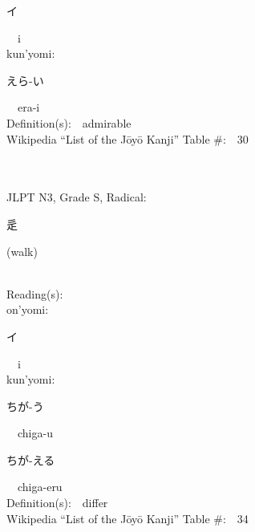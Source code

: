 \begin{multicols}{2}
{\hspace*{2em}}{\begin{CJK}{UTF8}{min} イ \end{CJK}}\ \ i\ \ \\
{\hspace*{1em}}kun'yomi:\ \ \\
{\hspace*{2em}}{\begin{CJK}{UTF8}{min} えら-い \end{CJK}}\ \ era-i\ \ \\
Definition(s):\ \ admirable \\
Wikipedia ``List of the J\=oy\=o Kanji'' Table \#:\ \ 30 \\
\ \ \\
{\fontsize{34pt}{40pt}  }\ \ \\  %
{JLPT N3, Grade S, Radical:\ \ {\begin{CJK}{UTF8}{min} 辵 \end{CJK}} (walk) } \\
Reading(s):\ \ \\
{\hspace*{1em}}on'yomi:\ \ \\
{\hspace*{2em}}{\begin{CJK}{UTF8}{min} イ \end{CJK}}\ \ i\ \ \\
{\hspace*{1em}}kun'yomi:\ \ \\
{\hspace*{2em}}{\begin{CJK}{UTF8}{min} ちが-う \end{CJK}}\ \ chiga-u\ \ \\
{\hspace*{2em}}{\begin{CJK}{UTF8}{min} ちが-える \end{CJK}}\ \ chiga-eru\ \ \\
Definition(s):\ \ differ \\
Wikipedia ``List of the J\=oy\=o Kanji'' Table \#:\ \ 34 \\
\ \ \\
{\fontsize{34pt}{40pt}  }\ \ \\  %

\end{multicols}
